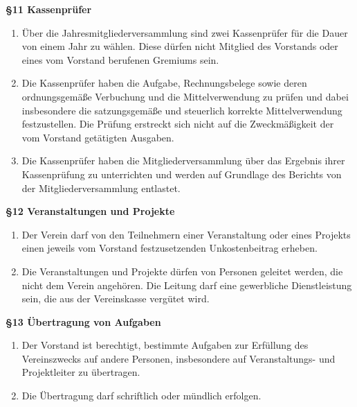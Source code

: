 \documentclass[a4paper,
               12pt,
               titlepage,
               parskip=half]{scrartcl}
\begin{document}
\vspace{1.0em}

\textbf{§11 Kassenprüfer}
{\small
	\begin{enumerate}
		\item Über die Jahresmitgliederversammlung sind zwei Kassenprüfer für die Dauer von einem Jahr zu wählen. Diese dürfen nicht Mitglied des Vorstands oder eines vom Vorstand berufenen Gremiums sein.
		\item Die Kassenprüfer haben die Aufgabe, Rechnungsbelege sowie deren ordnungsgemäße Verbuchung und die Mittelverwendung zu prüfen und dabei insbesondere die satzungsgemäße
		und steuerlich korrekte Mittelverwendung festzustellen. Die Prüfung erstreckt sich nicht auf die Zweckmäßigkeit der vom Vorstand getätigten Ausgaben.
		\item Die Kassenprüfer haben die Mitgliederversammlung über das Ergebnis ihrer Kassenprüfung zu unterrichten und werden auf Grundlage des Berichts von der Mitgliederversammlung entlastet.
	\end{enumerate}
}

\vspace{1.0em}

\textbf{§12 Veranstaltungen und Projekte}
{\small
	\begin{enumerate}
		\item Der Verein darf von den Teilnehmern einer Veranstaltung oder eines Projekts einen jeweils vom Vorstand festzusetzenden Unkostenbeitrag erheben.
		\item Die Veranstaltungen und Projekte dürfen von Personen geleitet werden, die nicht dem Verein angehören. Die Leitung darf eine gewerbliche Dienstleistung sein, die aus der Vereinskasse vergütet wird.
	\end{enumerate}
}

\vspace{1.0em}

\textbf{§13 Übertragung von Aufgaben}
{\small
	\begin{enumerate}
		\item Der Vorstand ist berechtigt, bestimmte Aufgaben zur Erfüllung des Vereinszwecks auf
		andere Personen, insbesondere auf Veranstaltungs- und Projektleiter zu übertragen.
		\item Die Übertragung darf schriftlich oder mündlich erfolgen.
	\end{enumerate}
}

\vspace{1.0em}
\end{document}
